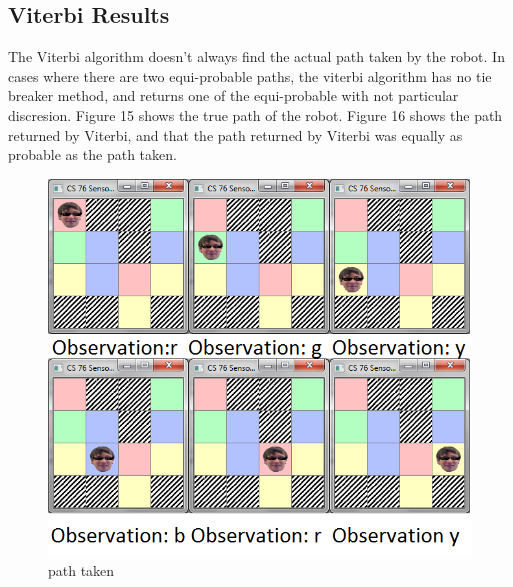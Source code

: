 \documentclass[a4paper]{article}
\begin{document}
\subsection{Viterbi Results}

The Viterbi algorithm doesn't always find the actual path taken by the robot. In cases where there are two equi-probable paths, the viterbi algorithm has no tie breaker method, and returns one of the equi-probable with not particular discresion. Figure 15 shows the true path of the robot. Figure 16 shows the path returned by Viterbi, and that the path returned by Viterbi was equally as probable as the path taken.

\begin{figure}[H]
\centering
\includegraphics[width=1\textwidth]{4x4robotUnambiguous.png}
\caption{\label{fig:2x2 maze}path taken}
\end{figure}
\end{document}
